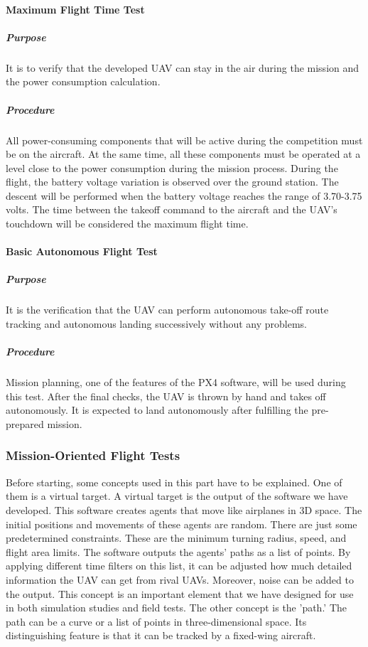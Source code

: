 \documentclass[12pt]{article}
\begin{document}
\paragraph*{Maximum Flight Time Test} 

\subparagraph*{Purpose} It is to verify that the developed UAV can stay in the air during the mission and the power consumption calculation.

\subparagraph*{Procedure} All power-consuming components that will be active during the competition must be on the aircraft. At the same time, all these components must be operated at a level close to the power consumption during the mission process. During the flight, the battery voltage variation is observed over the ground station. The descent will be performed when the battery voltage reaches the range of 3.70-3.75 volts. The time between the takeoff command to the aircraft and the UAV's touchdown will be considered the maximum flight time.

\paragraph*{Basic Autonomous Flight Test} 

\subparagraph*{Purpose} It is the verification that the UAV can perform autonomous take-off route tracking and autonomous landing successively without any problems.

\subparagraph*{Procedure} Mission planning, one of the features of the PX4 software, will be used during this test. After the final checks, the UAV is thrown by hand and takes off autonomously. It is expected to land autonomously after fulfilling the pre-prepared mission.

\subsubsection[]{Mission-Oriented Flight Tests}

Before starting, some concepts used in this part have to be explained. One of them is a virtual target. A virtual target is the output of the software we have developed. This software creates agents that move like airplanes in 3D space. The initial positions and movements of these agents are random. There are just some predetermined constraints. These are the minimum turning radius, speed, and flight area limits. The software outputs the agents' paths as a list of points. By applying different time filters on this list, it can be adjusted how much detailed information the UAV can get from rival UAVs. Moreover, noise can be added to the output. This concept is an important element that we have designed for use in both simulation studies and field tests. The other concept is the 'path.' The path can be a curve or a list of points in three-dimensional space. Its distinguishing feature is that it can be tracked by a fixed-wing aircraft.
\end{document}
